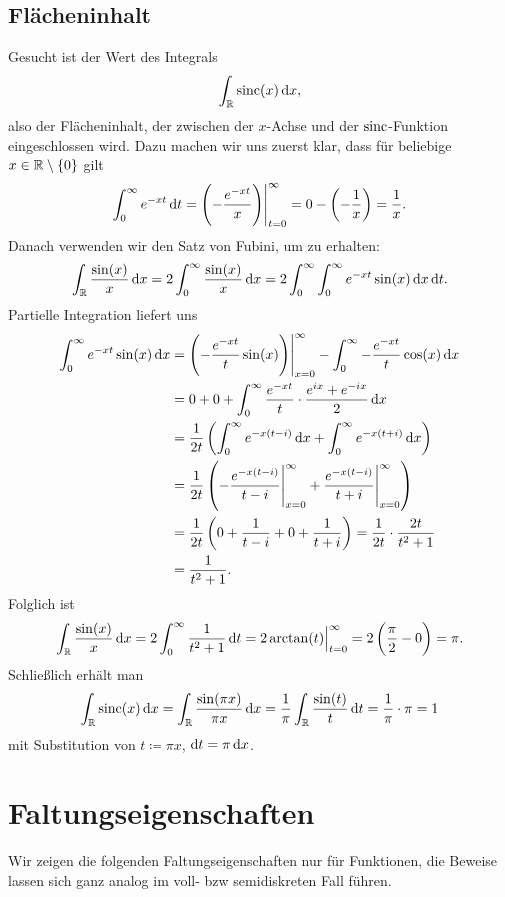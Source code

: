 \subsection{Flächeninhalt}
Gesucht ist der Wert des Integrals
\[
  \int_{\R} \sinc(x) \dif x,
\]
also der Flächeninhalt, der zwischen der $ x $-Achse und der $ \operatorname{sinc} $-Funktion eingeschlossen wird.
Dazu machen wir uns zuerst klar, dass für beliebige $ x \in \mathbb{R} \setminus \{ 0 \} $ gilt
\[
    \int_{0}^{\infty} e^{-xt} \dif t 
  = \eval{ \left( -\frac{e^{-xt}}{x} \right) }_{t = 0}^{\infty}
  = 0 - \left( -\frac{1}{x} \right) 
  = \frac{1}{x}.
\]
Danach verwenden wir den Satz von Fubini, um zu erhalten:
\[
    \int_{\R} \frac{\sin(x)}{x} \dif x
  = 2 \int_{0}^{\infty} \frac{\sin(x)}{x} \dif x
  = 2 \int_{0}^{\infty} \int_{0}^{\infty} e^{-xt} \sin(x) \dif x \dif t.
\]
Partielle Integration liefert uns
\begin{align*}
   \int_{0}^{\infty} e^{-xt} \sin(x) \dif x 
&= \eval{ \left( -\frac{e^{-xt}}{t} \sin(x) \right) }_{x = 0}^{\infty}
      - \int_{0}^{\infty} -\frac{e^{-xt}}{t} \cos(x) \dif x \\
&= 0 + 0 + \int_{0}^{\infty} \frac{e^{-xt}}{t} \cdot \frac{e^{ix} + e^{-ix}}{2} \dif x \\
&= \frac{1}{2t} \left( 
      \int_{0}^{\infty} e^{-x(t - i)} \dif x + \int_{0}^{\infty} e^{-x(t + i)} \dif x
   \right) \\
&= \frac{1}{2t} \left(
      \eval{ - \frac{e^{-x(t-i)}}{t-i} }_{x = 0}^{\infty}
      + \eval{ \frac{e^{-x(t-i)}}{t+i} }_{x = 0}^{\infty}
   \right) \\
&= \frac{1}{2t} \left( 0 + \frac{1}{t - i} + 0 + \frac{1}{t + i} \right)
 = \frac{1}{2t} \cdot \frac{2t}{t^{2} + 1} \\
&= \frac{1}{t^{2} + 1}.
\end{align*}
Folglich ist
\[
   \int_{\R} \frac{\sin(x)}{x} \dif x
= 2 \int_{0}^{\infty} \frac{1}{t^{2} + 1} \dif t
= 2 \eval[2]{\arctan(t)}_{t=0}^{\infty}
= 2 \left( \frac{\pi}{2} - 0 \right)
= \pi.
\]
Schließlich erhält man
\[
    \int_{\R} \sinc(x) \dif x
  = \int_{\R} \frac{\sin(\pi x)}{\pi x} \dif x
  = \frac{1}{\pi} \int_{\R} \frac{\sin(t)}{t} \dif t
  = \frac{1}{\pi} \cdot \pi
  = 1
\]
mit Substitution von $ t \coloneqq \pi x $, $ \dif t = \pi \dif x $.

\section{Faltungseigenschaften}
Wir zeigen die folgenden Faltungseigenschaften nur für Funktionen, die
Beweise lassen sich ganz analog im voll- bzw semidiskreten Fall führen.

